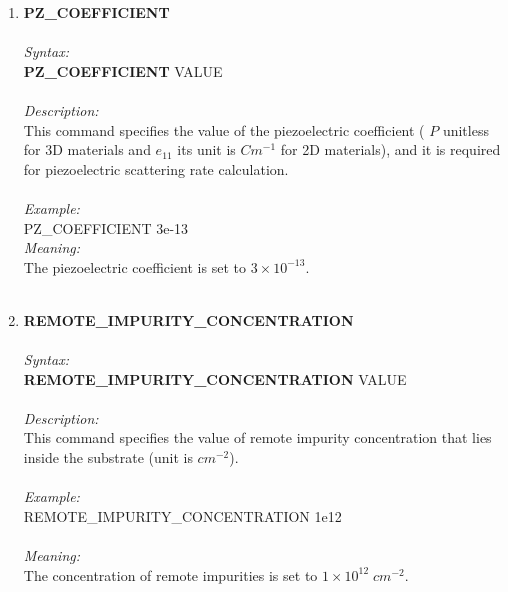 \documentclass[12pt]{article}
\begin{document}
\begin{enumerate}
    \item \textbf{PZ\_COEFFICIENT}   \\ \\
    \textit{Syntax:} \\
    \textbf{PZ\_COEFFICIENT} VALUE \\ \\
    \textit{Description:} \\
    This command specifies the value of the piezoelectric coefficient ( $P$ unitless for 3D materials and $e_{11}$ its unit is $Cm^{-1}$ for 2D materials), and it is required for piezoelectric scattering rate calculation. \\ \\
    \textit{Example:} \\
    PZ\_COEFFICIENT 3e-13 \\
    \textit{Meaning:} \\  
    The piezoelectric coefficient is set to $3 \times 10^{-13}$. \\ \\

    \item \textbf{REMOTE\_IMPURITY\_CONCENTRATION} \\ \\
    \textit{Syntax:} \\
    \textbf{REMOTE\_IMPURITY\_CONCENTRATION} VALUE \\ \\
    \textit{Description:} \\
    This command specifies the value of remote impurity concentration that lies inside the substrate (unit is $cm^{-2}$).\\ \\
    \textit{Example:} \\
    REMOTE\_IMPURITY\_CONCENTRATION 1e12 \\ \\
    \textit{Meaning:} \\  
    The concentration of remote impurities is set to $1 \times 10^{12} \; cm^{-2}$. \\ \\
    

\end{enumerate}
\end{document}
